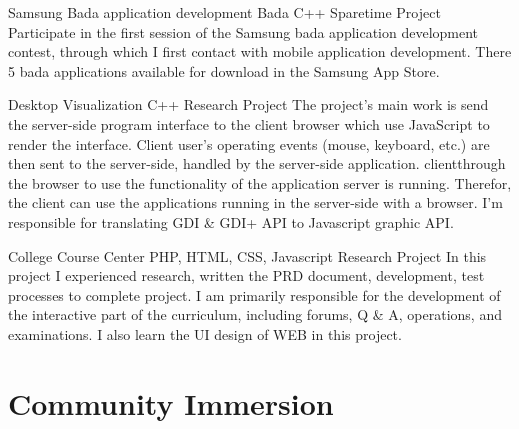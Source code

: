 \documentclass[11pt,a4paper]{moderncv}
\begin{document}
\vspace*{0.2\baselineskip}
{Samsung Bada application development}
{Bada C++}
{Sparetime Project}{}
{Participate in the first session of the Samsung bada application development contest, through which I first contact with mobile
application development. There 5 bada applications available for download in the Samsung App Store.
}

\vspace*{0.2\baselineskip}
{Desktop Visualization}
{C++}
{Research Project}{}
{The project's main work is send the server-side program interface to the client browser which use JavaScript to render the interface. 
Client user's operating events (mouse, keyboard, etc.) are then sent to the server-side, handled by the server-side application.
clientthrough the browser to use the functionality of the application server is running. Therefor, the client can use the
applications running in the server-side with a browser. I'm responsible for translating GDI \& GDI+ API to Javascript graphic API.
}

\vspace*{0.2\baselineskip}
{College Course Center}
{PHP, HTML, CSS, Javascript}
{Research Project}{}
{
In this project I experienced research, written the PRD document, development, test processes to complete project. 
I am primarily responsible for the development of the interactive part of the curriculum, including forums, Q \& A,
operations, and examinations. I also learn the UI design of WEB in this project.
}







\section{Community Immersion}
\end{document}
